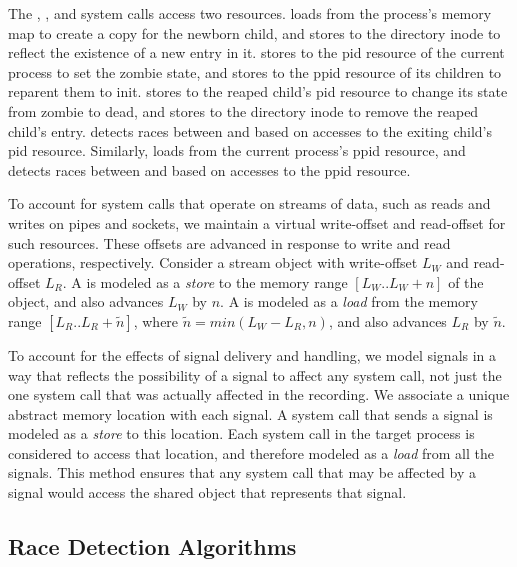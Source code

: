 The , , and  system calls access two
resources.   loads from the process's memory map to create a
copy for the newborn child, and stores to the  directory
inode to reflect the existence of a new entry in it.  stores
to the pid resource of the current process to set the zombie state, and
stores to the ppid resource of its children to reparent them to init.
 stores to the reaped child's pid resource to change its state
from zombie to dead, and stores to the  directory inode to
remove the reaped child's entry.  \racepro detects races between 
 and  based on accesses to the exiting child's pid
resource.  Similarly,  loads from the current process's
ppid resource, and \racepro detects races between  and 
based on accesses to the ppid resource.

To account for system calls that operate on streams of data, such as
reads and writes on pipes and sockets, we maintain a virtual
write-offset and read-offset for such resources.  These offsets are
advanced in response to write and read operations, respectively.
Consider a 
stream object with write-offset $L_W$ and read-offset $L_R$. A
 is modeled as a \emph{store} to the memory range
$[L_W..L_W+n]$ of the object, and also advances $L_W$ by $n$. A 
 is modeled as a \emph{load} from the memory range
$[L_R..L_R+\tilde{n}]$, where $\tilde{n} = min(L_W-L_R,n)$, and also 
advances $L_R$ by $\tilde{n}$.

To account for the effects of signal delivery and handling, we
model signals in a way that reflects the possibility of a signal to
affect any system call, not just the one system call that was actually
affected in the recording.  We associate a unique abstract memory  
location with each signal. A  system call that sends a signal
is modeled as a \emph{store} to this location. Each system call in
the target process is considered to access that location, and
therefore modeled as a \emph{load} from all the signals. This method 
ensures that any system call that may be affected by a signal would
access the shared object that represents that signal.

\subsection{Race Detection Algorithms} \label{racepro:sec:potential}

